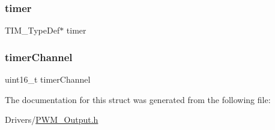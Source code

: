 \subsubsection{\texorpdfstring{timer}{timer}}
{\footnotesize\ttfamily T\+I\+M\+\_\+\+Type\+Def$\ast$ timer}

\mbox{\label{struct_p_w_m___type_def_a2ceeb6205773419966e920a22828f526}} 
\subsubsection{\texorpdfstring{timer\+Channel}{timerChannel}}
{\footnotesize\ttfamily uint16\+\_\+t timer\+Channel}



The documentation for this struct was generated from the following file\+:\begin{DoxyCompactItemize}
\item 
Drivers/\hyperlink{_p_w_m___output_8h}{P\+W\+M\+\_\+\+Output.\+h}\end{DoxyCompactItemize}
